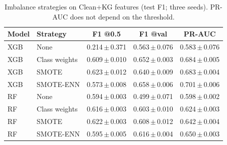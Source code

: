 \begin{table}[t]
\caption{Imbalance strategies on Clean+KG features (test F1; three seeds). PR-AUC does not depend on the threshold.}
\label{tab:imbalance}
\centering
\footnotesize
\setlength{\tabcolsep}{3pt}
\begin{tabular}{@{}llccc@{}}
\toprule
Model & Strategy & F1 @0.5 & F1 @val & PR-AUC \\
\midrule
XGB & None & 0.214\,$\pm$\,0.371 & 0.563\,$\pm$\,0.076 & 0.583\,$\pm$\,0.076 \\
XGB & Class weights & 0.609\,$\pm$\,0.010 & 0.652\,$\pm$\,0.003 & 0.684\,$\pm$\,0.005 \\
XGB & SMOTE & 0.623\,$\pm$\,0.012 & 0.640\,$\pm$\,0.009 & 0.683\,$\pm$\,0.004 \\
XGB & SMOTE-ENN & 0.573\,$\pm$\,0.008 & 0.658\,$\pm$\,0.006 & 0.701\,$\pm$\,0.006 \\
\midrule
RF & None & 0.594\,$\pm$\,0.003 & 0.499\,$\pm$\,0.071 & 0.598\,$\pm$\,0.002 \\
RF & Class weights & 0.616\,$\pm$\,0.003 & 0.603\,$\pm$\,0.010 & 0.624\,$\pm$\,0.003 \\
RF & SMOTE & 0.622\,$\pm$\,0.003 & 0.608\,$\pm$\,0.012 & 0.642\,$\pm$\,0.004 \\
RF & SMOTE-ENN & 0.595\,$\pm$\,0.005 & 0.616\,$\pm$\,0.004 & 0.650\,$\pm$\,0.003 \\
\bottomrule
\end{tabular}
\end{table}